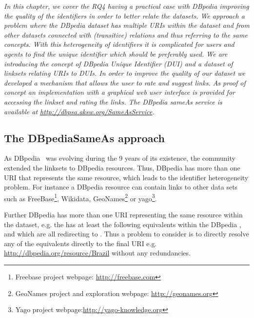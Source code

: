 \textit{In this chapter, we cover the RQ4 having a practical case with DBpedia improving the quality of the identifiers in order to better relate the datasets. We approach a problem where the DBpedia dataset has multiple URIs within the dataset and from other datasets connected with (transitive)  relations and thus referring to the same concepts.
With this heterogeneity of identifiers it is complicated for users and agents to find the unique identifier which should be preferably used.
We are introducing the concept of DBpedia Unique Identifier (DUI) and a dataset of linksets relating URIs to DUIs.
In order to improve the quality of our dataset we developed a mechanism that allows the user to rate and suggest links.
As proof of concept an implementation with a graphical web user interface is provided for accessing the linkset and rating the links.
The DBpedia sameAs service is available at \url{http://dbpsa.aksw.org/SameAsService}.}

\subsection{The DBpediaSameAs approach}


As DBpedia~\cite{dbpedia-swj} was evolving during the 9 years of its existence, the community extended the linksets to DBpedia resources.
Thus, DBpedia has more than one URI that represents the same resource, which leads to the identifier heterogeneity problem. 
For instance a DBpedia resource can contain  links to other data sets such as FreeBase\footnote{Freebase project webpage: \url{http://freebase.com}}, Wikidata, GeoNames\footnote{GeoNames project and exploration webpage: \url{http://geonames.org}} or yago\footnote{Yago project webpage:\url{http://yago-knowledge.org}}.

Further DBpedia has more than one URI representing the same resource within the dataset, e.g. the  has at least the following equivalents within the DBpedia ,  and  which are all redirecting to .
Thus a problem to consider is to directly resolve any of the equivalents directly to the final URI e.g. \url{http://dbpedia.org/resource/Brazil} without any redundancies.


